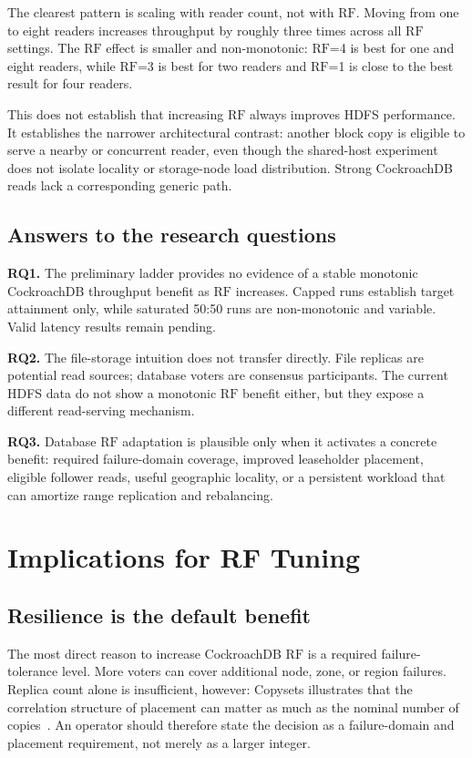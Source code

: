 \documentclass[a4paper,10pt,twocolumn]{article}
\newcommand{\rf}{\ensuremath{\mathrm{RF}}}
\newcommand{\cockroach}{CockroachDB}
\newcommand{\hdfs}{HDFS}
\begin{document}
The clearest pattern is scaling with reader count, not with \rf{}. Moving from
one to eight readers increases throughput by roughly three times across all
\rf{} settings. The \rf{} effect is smaller and non-monotonic: \rf{}=4 is best
for one and eight readers, while \rf{}=3 is best for two readers and \rf{}=1
is close to the best result for four readers.

This does not establish that increasing \rf{} always improves \hdfs{}
performance. It establishes the narrower architectural contrast: another
block copy is eligible to serve a nearby or concurrent reader, even though the
shared-host experiment does not isolate locality or storage-node load
distribution. Strong \cockroach{} reads lack a corresponding generic path.

\subsection{Answers to the research questions}

\textbf{RQ1.} The preliminary ladder provides no
evidence of a stable monotonic \cockroach{} throughput benefit as \rf{}
increases. Capped runs establish target attainment only, while saturated 50:50
runs are non-monotonic and variable. Valid latency results remain pending.

\textbf{RQ2.} The file-storage intuition does not
transfer directly. File replicas are potential read sources; database voters
are consensus participants. The current \hdfs{} data do not show a monotonic
\rf{} benefit either, but they expose a different read-serving mechanism.

\textbf{RQ3.} Database \rf{} adaptation is
plausible only when it activates a concrete benefit: required failure-domain
coverage, improved leaseholder placement, eligible follower reads, useful
geographic locality, or a persistent workload that can amortize range
replication and rebalancing.

\section{Implications for RF Tuning}
\label{sec:discussion}

\subsection{Resilience is the default benefit}

The most direct reason to increase \cockroach{} \rf{} is a required
failure-tolerance level. More voters can cover additional node, zone, or region
failures. Replica count alone is insufficient, however: Copysets illustrates
that the correlation structure of placement can matter as much as the nominal
number of copies~\citep{cidon2013copysets}. An operator should therefore state
the decision as a failure-domain and placement requirement, not merely as a
larger integer.
\end{document}
